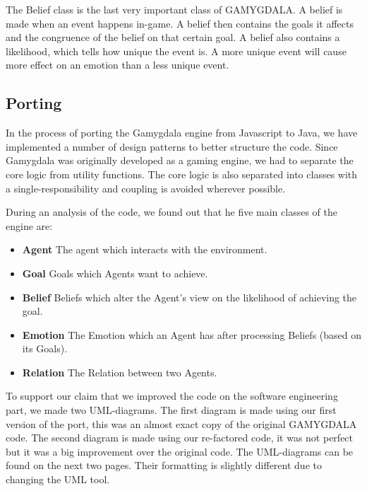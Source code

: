 The Belief class is the last very important class of GAMYGDALA. A belief is made when an event happens in-game. A belief then contains the goals it affects and the congruence of the belief on that certain goal. A belief also contains a likelihood, which tells how unique the event is. A more unique event will cause more effect on an emotion than a less unique event.

\subsection{Porting}
In the process of porting the Gamygdala engine from Javascript to Java, we have implemented a number of design patterns to better structure the code. Since Gamygdala was originally developed as a gaming engine, we had to separate the core logic from utility functions. The core logic is also separated into classes with a single-responsibility and coupling is avoided wherever possible. 

During an analysis of the code, we found out that he five main classes of the engine are:
\begin{itemize}
	\item \textbf{Agent} The agent which interacts with the environment.
	\item \textbf{Goal} Goals which Agents want to achieve.
	\item \textbf{Belief} Beliefs which alter the Agent's view on the likelihood of achieving the goal.
	\item \textbf{Emotion} The Emotion which an Agent has after processing Beliefs (based on its Goals).
	\item \textbf{Relation} The Relation between two Agents.
\end{itemize}

To support our claim that we improved the code on the software engineering part, we made two UML-diagrams. The first diagram is made using our first version of the port, this was an almost exact copy of the original GAMYGDALA code. The second diagram is made using our re-factored code, it was not perfect but it was a big improvement over the original code. The UML-diagrams can be found on the next two pages. Their formatting is slightly different due to changing the UML tool.\\

